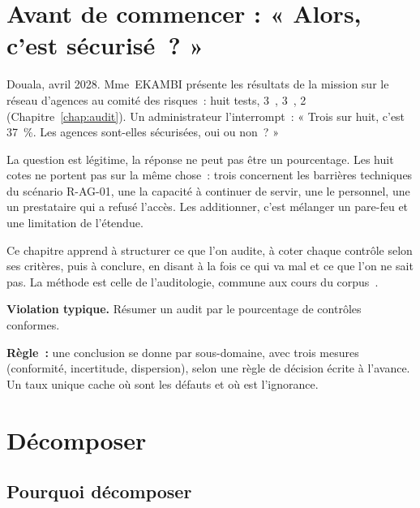 \bigskip

\section*{Avant de commencer : « Alors, c'est sécurisé~? »}

Douala, avril 2028. Mme~EKAMBI présente les résultats de la mission sur le
réseau d'agences au comité des risques~: huit tests, 3~\OUI{}, 3~\NON{},
2~\NEK{} (Chapitre~\ref{chap:audit}). Un administrateur l'interrompt~:
« Trois sur huit, c'est 37~\%. Les agences sont-elles sécurisées, oui ou
non~? »

La question est légitime, la réponse ne peut pas être un pourcentage. Les
huit cotes ne portent pas sur la même chose~: trois concernent les
barrières techniques du scénario R-AG-01, une la capacité à continuer de
servir, une le personnel, une un prestataire qui a refusé l'accès. Les
additionner, c'est mélanger un pare-feu et une limitation de l'étendue.

\medskip

Ce chapitre apprend à structurer ce que l'on audite, à coter chaque
contrôle selon ses critères, puis à conclure, en disant à la fois ce qui va
mal et ce que l'on ne sait pas. La méthode est celle de l'auditologie,
commune aux cours du corpus~\cite{minka2026auditologie,minka2026nek}.

\begin{boxalert}
\textbf{Violation typique.} Résumer un audit par le pourcentage de
contrôles conformes.

\smallskip
\textbf{Règle~:} une conclusion se donne par sous-domaine, avec trois
mesures (conformité, incertitude, dispersion), selon une règle de décision
écrite à l'avance. Un taux unique cache où sont les défauts et où est
l'ignorance.
\end{boxalert}

\separateur

\section{Décomposer}
\label{sec:c07-decomposer}

\subsection{Pourquoi décomposer}

